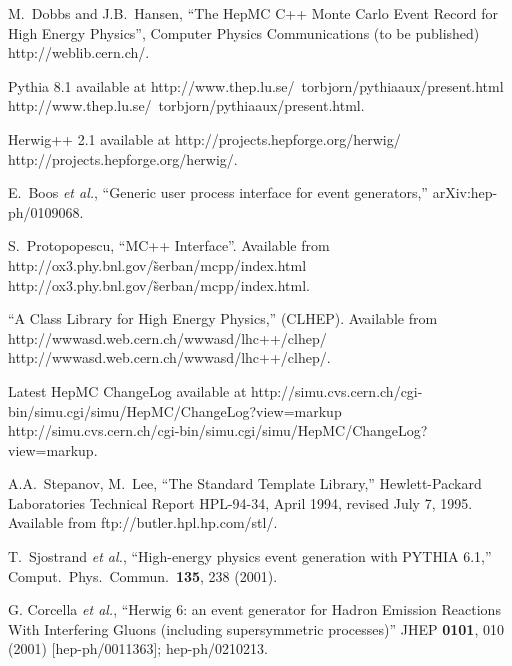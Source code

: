\documentclass[11pt,letterpaper]{article}
\begin{document}
\begin{thebibliography}{99}

  M.~Dobbs and J.B.~Hansen, ``The HepMC C++ Monte Carlo Event Record for
  High Energy Physics'', Computer Physics Communications (to be
  published) 
  {http://weblib.cern.ch/}.  

  Pythia 8.1 available at \htmladdnormallink
  {http://www.thep.lu.se/~torbjorn/pythiaaux/present.html}
  {http://www.thep.lu.se/~torbjorn/pythiaaux/present.html}.

  Herwig++ 2.1 available at \htmladdnormallink
  {http://projects.hepforge.org/herwig/}
  {http://projects.hepforge.org/herwig/}.

E.~Boos {\it et al.},
``Generic user process interface for event generators,''
arXiv:hep-ph/0109068.

  S.~Protopopescu, ``MC++ Interface''.
  Available from \htmladdnormallink
  {http://ox3.phy.bnl.gov/\~serban/mcpp/index.html}
  {http://ox3.phy.bnl.gov/\~serban/mcpp/index.html}.

  ``A Class Library for High Energy Physics,'' (CLHEP).
  Available from 
  \htmladdnormallink
  {http://wwwasd.web.cern.ch/wwwasd/lhc++/clhep/}
  {http://wwwasd.web.cern.ch/wwwasd/lhc++/clhep/}.

  Latest HepMC ChangeLog available at  \htmladdnormallink
  {http://simu.cvs.cern.ch/cgi-bin/simu.cgi/simu/HepMC/ChangeLog?view=markup}
  {http://simu.cvs.cern.ch/cgi-bin/simu.cgi/simu/HepMC/ChangeLog?view=markup}.

  A.A.~Stepanov, M.~Lee, ``The Standard Template Library,''
  Hewlett-Packard Laboratories Technical Report HPL-94-34, April 1994,
  revised July 7, 1995.
  Available from 
  {ftp://butler.hpl.hp.com/stl/}.

  T.~Sjostrand {\it et al.}, 
  ``High-energy physics event generation with PYTHIA 6.1,''
  Comput.\ Phys.\ Commun.\  {\bf 135}, 238 (2001).

   G. Corcella {\it et al.}, 
  ``Herwig 6: an event generator for Hadron Emission Reactions
  With Interfering Gluons (including supersymmetric processes)''
  JHEP {\bf 0101}, 010 (2001) [hep-ph/0011363]; hep-ph/0210213.


\end{thebibliography}
\end{document}
